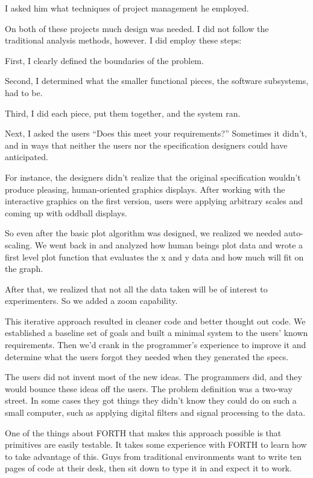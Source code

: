 I asked him what techniques of project management he employed.

\begin{tfquot}
\noindent On both of these projects much design was needed. I did not follow the
traditional analysis methods, however. I did employ these steps:

\noindent First, I clearly defined the boundaries of the problem.

\noindent Second, I determined what the smaller functional pieces, the software
subsystems, had to be.

\noindent Third, I did each piece, put them together, and the system ran.

\noindent Next, I asked the users ``Does this meet your requirements?'' Sometimes it
didn't, and in ways that neither the users nor the specification designers
could have anticipated.

\noindent For instance, the designers didn't realize that the original
specification wouldn't produce pleasing, human-oriented graphics
displays. After working with the interactive graphics on the first
version, users were applying arbitrary scales and coming up with
oddball displays.

\noindent So even after the basic plot algorithm was designed, we realized we
needed auto-scaling. We went back in and analyzed how human beings
plot data and wrote a first level plot function that evaluates the x
and y data and how much will fit on the graph.

\noindent After that, we realized that not all the data taken will be of
interest to experimenters. So we added a zoom capability.

\noindent This iterative approach resulted in cleaner code and better thought
out code. We established a baseline set of goals and built a minimal
system to the users' known requirements. Then we'd crank in the
programmer's experience to improve it and determine what the users
forgot they needed when they generated the specs.

\noindent The users did not invent most of the new ideas. The programmers did,
and they would bounce these ideas off the users. The problem
definition was a two-way street. In some cases they got things they
didn't know they could do on such a small computer, such as applying
digital filters and signal processing to the data.

\noindent One of the things about FORTH that makes this approach possible is
that primitives are easily testable. It takes some experience with
FORTH to learn how to take advantage of this. Guys from traditional
environments want to write ten pages of code at their desk, then sit
down to type it in and expect it to work.


\end{tfquot}
